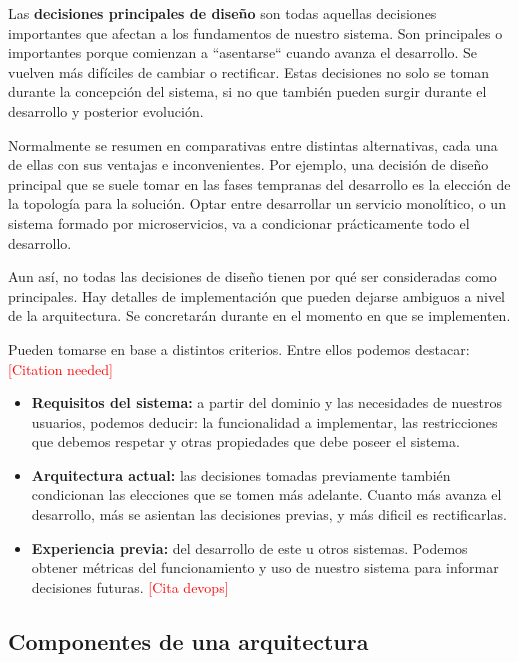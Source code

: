 Las \textbf{decisiones principales de diseño} son todas aquellas decisiones importantes que afectan a los fundamentos de nuestro sistema. Son principales o importantes porque comienzan a ``asentarse`` cuando avanza el desarrollo. Se vuelven más difíciles de cambiar o rectificar. \cite{taylorSoftwareArchitectureFoundations2009} Estas decisiones no solo se toman durante la concepción del sistema, si no que también pueden surgir durante el desarrollo y posterior evolución.

Normalmente se resumen en comparativas entre distintas alternativas, cada una de ellas con sus ventajas e inconvenientes. Por ejemplo, una decisión de diseño principal que se suele tomar en las fases tempranas del desarrollo es la elección de la topología para la solución. Optar entre desarrollar un servicio monolítico, o un sistema formado por microservicios, va a condicionar prácticamente todo el desarrollo.

Aun así, no todas las decisiones de diseño tienen por qué ser consideradas como principales. Hay detalles de implementación que pueden dejarse ambiguos a nivel de la arquitectura. Se concretarán durante en el momento en que se implementen.

 Pueden tomarse en base a distintos criterios. Entre ellos podemos destacar: \textcolor{red}{[Citation needed]}

    \begin{itemize}
        \item \textbf{Requisitos del sistema:} a partir del dominio y las necesidades de nuestros usuarios, podemos deducir: la funcionalidad a implementar, las restricciones que debemos respetar y otras propiedades que debe poseer el sistema.

        \item \textbf{Arquitectura actual:} las decisiones tomadas previamente también condicionan las elecciones que se tomen más adelante. Cuanto más avanza el desarrollo, más se asientan las decisiones previas, y más dificil es rectificarlas.

        \item \textbf{Experiencia previa:} del desarrollo de este u otros sistemas. Podemos obtener métricas del funcionamiento y uso de nuestro sistema para informar decisiones futuras. \textcolor{red}{[Cita devops]}
    \end{itemize}

\subsection{Componentes de una arquitectura}


